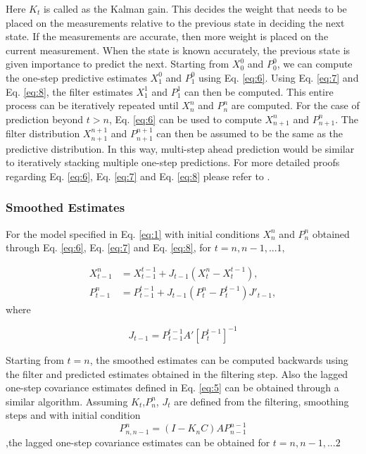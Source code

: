 \documentclass{article}
\begin{document}
Here $K_t$ is called as the Kalman gain. This decides the weight that needs to be placed on the measurements relative to the previous state in deciding the next state. If the measurements are accurate, then more weight is placed on the current measurement. When the state is known accurately, the previous state is given importance to predict the next.  Starting from $X_{0}^0$ and $P_0^0$, we can compute the one-step predictive estimates $X_{1}^0$ and $P_{1}^0$ using Eq. \ref{eq:6}. Using Eq. \ref{eq:7} and Eq. \ref{eq:8}, the filter estimates $X_{1}^1$ and $P_{1}^1$ can then be computed. This entire process can be iteratively repeated until $X_{n}^n$ and $P_{n}^n$ are computed. For the case of prediction beyond $t>n$, Eq. \ref{eq:6} can be used to compute $X_{n+1}^n$ and $P_{n+1}^n$. The filter distribution $X_{n+1}^{n+1}$ and $P_{n+1}^{n+1}$  can then be assumed to be the same as the predictive distribution. In this way, multi-step ahead prediction would be similar to iteratively stacking multiple one-step predictions. For more detailed proofs regarding Eq. \ref{eq:6}, Eq. \ref{eq:7} and Eq. \ref{eq:8} please refer to \cite{shumstof2000}.

\subsubsection{Smoothed Estimates}\label{ssec:smoothing}
For the model specified in Eq. \ref{eq:1} with initial conditions $X_n^n$ and $P_n^n$ obtained through Eq. \ref{eq:6}, Eq. \ref{eq:7} and Eq. \ref{eq:8}, for $t = n,n-1,...1,$ 

\begin{equation}\label{eq:9}
    \begin{split}
        X_{t-1}^n&=X_{t-1}^{t-1} + J_{t-1}(X_t^n-X_t^{t-1}), \\
        P_{t-1}^n&=P_{t-1}^{t-1} + J_{t-1}(P_t^n-P_t^{t-1})J'_{t-1},
    \end{split}
\end{equation}
where 

\begin{equation}\label{eq:10}
    J_{t-1} = P_{t-1}^{t-1}A'[P_{t}^{t-1}]^{-1}
\end{equation}

Starting from $t=n$, the smoothed estimates can be computed backwards using the filter and predicted estimates obtained in the filtering step. Also the lagged one-step covariance estimates defined in Eq. \ref{eq:5} can be obtained through a similar algorithm. Assuming $K_t$,$P_n^n$, $J_t$ are defined from the filtering, smoothing steps and with initial condition 
\begin{equation}\label{eq:11}
    P^n_{n,n-1} = (I - K_nC)AP_{n-1}^{n-1}    
\end{equation}
,the lagged one-step covariance estimates can be obtained for $t=n,n-1,...2$
\end{document}
